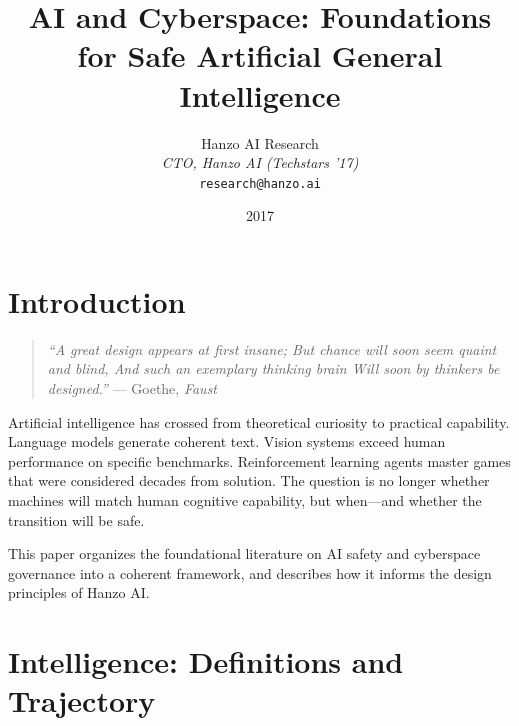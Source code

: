 \documentclass[11pt,twocolumn]{article}
\title{AI and Cyberspace: Foundations for Safe Artificial General Intelligence}
\author{
    Hanzo AI Research \\
    \textit{CTO, Hanzo AI (Techstars '17)} \\
    \texttt{research@hanzo.ai}
}
\date{2017}
\begin{document}
\hanzocoverpage


\section{Introduction}
\label{sec:intro}

\begin{quote}
\textit{``A great design appears at first insane; But chance will soon seem
quaint and blind, And such an exemplary thinking brain Will soon by thinkers be
designed.''} --- Goethe, \textit{Faust}
\end{quote}

Artificial intelligence has crossed from theoretical curiosity to practical
capability. Language models generate coherent text. Vision systems exceed human
performance on specific benchmarks. Reinforcement learning agents master games
that were considered decades from solution. The question is no longer whether
machines will match human cognitive capability, but when---and whether the
transition will be safe.

This paper organizes the foundational literature on AI safety and cyberspace
governance into a coherent framework, and describes how it informs the design
principles of Hanzo AI.

\section{Intelligence: Definitions and Trajectory}
\label{sec:intelligence}
\end{document}
